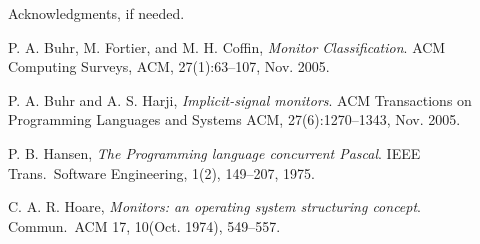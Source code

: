 \documentclass[preprint]{sigplanconf}
\begin{document}
\acks

Acknowledgments, if needed.





\begin{thebibliography}{}
\softraggedright


  P. A. Buhr, M. Fortier, and M. H. Coffin, \emph{Monitor Classification}. ACM 
  Computing Surveys, ACM, 27(1):63--107, 
  Nov. 2005.
  
  P. A. Buhr and A. S. Harji, \emph{Implicit-signal monitors}. ACM 
  Transactions on Programming Languages and Systems ACM, 27(6):1270--1343, 
  Nov. 2005.

  P. B. Hansen, \emph{The Programming language concurrent Pascal}. IEEE
  Trans.~Software Engineering, 1(2), 149--207, 1975.

  C. A. R. Hoare, \emph{Monitors: an operating system structuring concept}. 
  Commun.~ACM 17, 10(Oct. 1974), 549--557.



\end{thebibliography}
\end{document}
